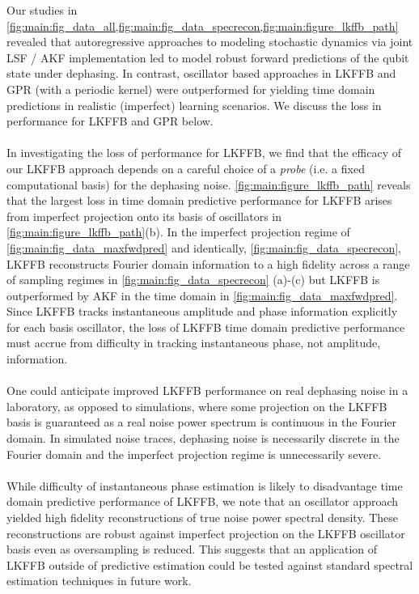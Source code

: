\documentclass[pra, reprint]{revtex4-1}
\begin{document}
Our studies in  \cref{fig:main:fig_data_all,fig:main:fig_data_specrecon,fig:main:figure_lkffb_path} revealed that autoregressive approaches to modeling stochastic dynamics via joint LSF / AKF implementation led to model robust forward predictions of the qubit state under dephasing. In contrast, oscillator based approaches in LKFFB and GPR (with a periodic kernel) were outperformed for yielding time domain predictions in realistic (imperfect) learning scenarios. We discuss the loss in performance for LKFFB and GPR below. 
\\
\\
In investigating the loss of performance for LKFFB, we find that the efficacy of our LKFFB approach depends on a careful choice of a \textit{probe} (i.e. a fixed computational basis) for the dephasing noise. \cref{fig:main:figure_lkffb_path} reveals that the largest loss in time domain predictive performance for LKFFB arises from imperfect projection onto its basis of oscillators in \cref{fig:main:figure_lkffb_path}(b). In the imperfect projection regime of \cref{fig:main:fig_data_maxfwdpred} and identically, \cref{fig:main:fig_data_specrecon}, LKFFB reconstructs Fourier domain information to a high fidelity across a range of sampling regimes in \cref{fig:main:fig_data_specrecon} (a)-(c) but LKFFB is outperformed by AKF in the time domain in \cref{fig:main:fig_data_maxfwdpred}. Since LKFFB tracks instantaneous amplitude and phase information explicitly for each basis oscillator, the loss of LKFFB time domain predictive performance must accrue from difficulty in tracking instantaneous phase, not amplitude, information. 
\\
\\
One could anticipate improved LKFFB performance on real dephasing noise in a laboratory, as opposed to simulations, where some projection on the LKFFB basis is guaranteed as a real noise power spectrum is continuous in the Fourier domain.  In simulated noise traces, dephasing noise is necessarily discrete in the Fourier domain and the imperfect projection regime is unnecessarily severe.
\\
\\
While difficulty of instantaneous phase estimation is likely to disadvantage time domain predictive performance of LKFFB, we note that an oscillator approach yielded high fidelity reconstructions of true noise power spectral density. These reconstructions are robust against imperfect projection on the LKFFB oscillator basis even as oversampling is reduced. This suggests that an application of LKFFB outside of predictive estimation could be tested against standard spectral estimation techniques in future work.
\end{document}

